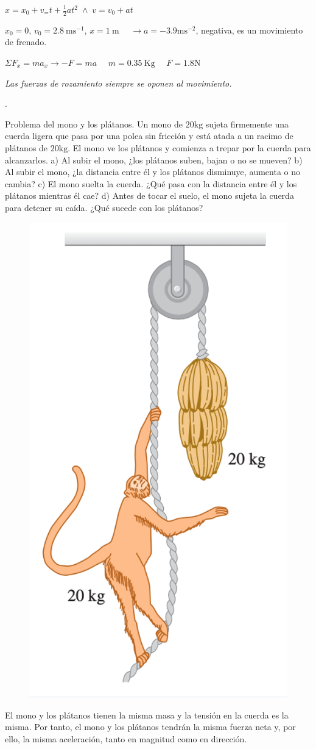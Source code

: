 $x=x_0+ v_= t + \frac 1 2 a t^2 \; \wedge \; v=v_0+a t$

$x_0=0$, $v_0=2.8\ \mathrm{m s}^{-1}$, $x=1\ \mathrm{m}$ $\quad \to a=-3.9 \mathrm{ms}^{-2}$, negativa, es un movimiento de frenado.

$\Sigma F_x=m a_x \to -F=ma $ $\quad m=0.35\ \mathrm{Kg}$ $\quad F=1.8 \mathrm{N}$

\emph{Las fuerzas de rozamiento siempre se oponen al movimiento.}


\newpage %
\begin{prob}.
\begin{multicols}{2}
Problema del mono y los plátanos. Un mono de $20 \mathrm{kg}$ sujeta firmemente una cuerda ligera que pasa por una polea sin fricción y está atada a un racimo de plátanos de $20 \mathrm{kg}$. El mono ve los plátanos y comienza a trepar por la cuerda para alcanzarlos. a) Al subir el mono, ¿los plátanos suben, bajan o no se mueven? b) Al subir el mono, ¿la distancia entre él y los plátanos disminuye, aumenta o no cambia? c) El mono suelta la cuerda. ¿Qué pasa con la distancia entre él y los plátanos mientras él cae? d) Antes de tocar el suelo, el mono sujeta la cuerda para detener su caída. ¿Qué sucede con los plátanos?
\begin{figure}[H]
	\centering
	\includegraphics[width=.35\textwidth]{imagenes/imagenes03/T03IM36.png}
	\end{figure}	
\end{multicols}	
\end{prob}

\vspace{10mm} %
El mono y los plátanos tienen la misma masa y la tensión en la cuerda es la misma. Por tanto, el mono y los plátanos tendrán la misma fuerza neta y, por ello, la misma aceleración, tanto en magnitud como en dirección.

